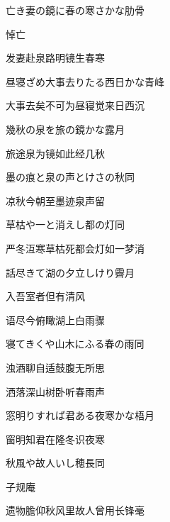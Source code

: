 \begin{haiku}
    {\FH 亡き妻の鏡に春の寒さかな}\hfill{\FH 肋骨}

    {\FK 悼亡}

    {\FK 发妻赴泉路明镜生春寒}
\end{haiku}

\begin{haiku}
    {\FH 昼寝ざめ大事去りたる西日かな}\hfill{\FH 青峰}

    {\FK 大事去矣不可为昼寝觉来日西沉}
\end{haiku}

\begin{haiku}
    {\FH 幾秋の泉を旅の鏡かな}\hfill{\FH 露月}

    {\FK 旅途泉为镜如此经几秋}
\end{haiku}

\begin{haiku}
    {\FH 墨の痕と泉の声とけさの秋}\hfill{\FH 同}

    {\FK 凉秋今朝至墨迹泉声留}
\end{haiku}

\begin{haiku}
    {\FH 草枯や一と消えし都の灯}\hfill{\FH 同}

    {\FK 严冬沍寒草枯死都会灯如一梦消}
\end{haiku}

\begin{haiku}
    {\FH 話尽きて湖の夕立しけり}\hfill{\FH 霽月}

    {\FK 入吾室者但有清风}

    {\FK 语尽今俯瞰湖上白雨骤}
\end{haiku}

\begin{haiku}
    {\FH 寝てきくや山木にふる春の雨}\hfill{\FH 同}

    {\FK 浊酒聊自适鼓腹无所思}

    {\FK 洒落深山树卧听春雨声}
\end{haiku}

\begin{haiku}
    {\FH 窓明りすれば君ある夜寒かな}\hfill{\FH 梧月}

    {\FK 窗明知君在隆冬识夜寒}
\end{haiku}

\begin{haiku}
    {\FH 秋風や故人いし穂長}\hfill{\FH 同}

    {\FK 子规庵}

    {\FK 遗物膽仰秋风里故人曾用长锋毫}
\end{haiku}

